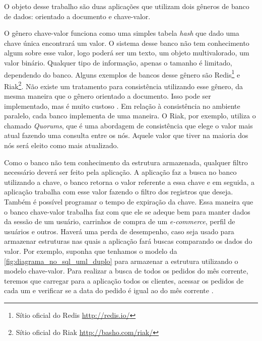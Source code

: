 O objeto desse trabalho são duas aplicações que utilizam dois gêneros de banco de dados: orientado a documento e chave-valor.

O gênero chave-valor funciona como uma simples tabela \textit{hash} que dado uma chave única encontrará um valor. O sistema desse banco não tem conhecimento algum sobre esse valor, logo poderá ser um texto, um objeto multivalorado, um valor binário. Qualquer tipo de informação, apenas o tamanho é limitado, dependendo do banco. Alguns exemplos de bancos desse gênero são \ac{Redis}\footnote{Sítio oficial do Redis \url{http://redis.io/}} e Riak\footnote{Sítio oficial do Riak \url{http://basho.com/riak/}}. Não existe um tratamento para consistência utilizando esse gênero, da mesma maneira que o gênero orientado a documento. Isso pode ser implementado, mas é muito custoso \cite{NoSQL}. Em relação à consistência no ambiente paralelo, cada banco implementa de uma maneira. O Riak, por exemplo, utiliza o chamado \textit{Quorums}, que é uma abordagem de consistência que elege o valor mais atual fazendo uma consulta entre os nós. Aquele valor que tiver na maioria dos nós será eleito como mais atualizado.

Como o banco não tem conhecimento da estrutura armazenada, qualquer filtro necessário deverá ser feito pela aplicação. A aplicação faz a busca no banco utilizando a chave, o banco retorna o valor referente a essa chave e em seguida, a aplicação trabalha com esse valor fazendo o filtro dos registros que deseja. Também é possível programar o tempo de expiração da chave. Essa maneira que o banco chave-valor trabalha faz com que ele se adeque bem para manter dados da sessão de um usuário, carrinhos de compra de um \textit{e-commerce}, perfil de usuários e outros. Haverá uma perda de desempenho, caso seja usado para armazenar estruturas nas quais a aplicação fará buscas comparando os dados do valor. Por exemplo, suponha que tenhamos o modelo da \autoref{fig:diagrama_no_sql_uml_duplo} para armazenar a estrutura utilizando o modelo chave-valor. Para realizar a busca de todos os pedidos do mês corrente, teremos que carregar para a aplicação todos os clientes, acessar os pedidos de cada um e verificar se a data do pedido é igual ao do mês corrente \cite{NoSQL}.


